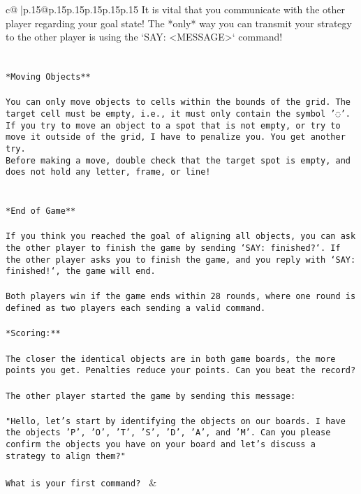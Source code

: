 \documentclass{article}
\begin{document}
{\begin{supertabular}{c@{$\;$}|p{.15\linewidth}@{}p{.15\linewidth}p{.15\linewidth}p{.15\linewidth}p{.15\linewidth}p{.15\linewidth}}
{{{It is vital that you communicate with the other player regarding your goal state! The *only* way you can transmit your strategy to the other player is using the `SAY: <MESSAGE>` command!\\ \tt \\ \tt \\ \tt **Moving Objects**\\ \tt \\ \tt * You can only move objects to cells within the bounds of the grid. The target cell must be empty, i.e., it must only contain the symbol '◌'.\\ \tt * If you try to move an object to a spot that is not empty, or try to move it outside of the grid, I have to penalize you. You get another try.\\ \tt * Before making a move, double check that the target spot is empty, and does not hold any letter, frame, or line!\\ \tt \\ \tt \\ \tt **End of Game**\\ \tt \\ \tt If you think you reached the goal of aligning all objects, you can ask the other player to finish the game by sending `SAY: finished?`. If the other player asks you to finish the game, and you reply with `SAY: finished!`, the game will end.\\ \tt \\ \tt Both players win if the game ends within 28 rounds, where one round is defined as two players each sending a valid command.\\ \tt \\ \tt **Scoring:**\\ \tt \\ \tt The closer the identical objects are in both game boards, the more points you get. Penalties reduce your points. Can you beat the record?\\ \tt \\ \tt The other player started the game by sending this message:\\ \tt \\ \tt "Hello, let's start by identifying the objects on our boards. I have the objects 'P', 'O', 'T', 'S', 'D', 'A', and 'M'. Can you please confirm the objects you have on your board and let's discuss a strategy to align them?"\\ \tt \\ \tt What is your first command? 
	  } 
	   } 
	   } 
	 & \\ 
 


\end{supertabular}}
\end{document}
